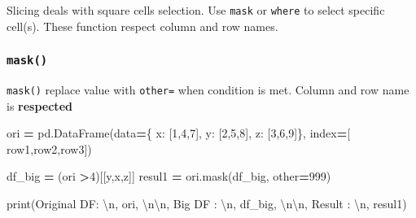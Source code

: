 \documentclass[
]{book}
\newenvironment{Shaded}{\begin{snugshade}}{\end{snugshade}}
\newcommand{\BuiltInTok}[1]{#1}
\newcommand{\CharTok}[1]{\textcolor[rgb]{0.5,0.5,0.5}{#1}}
\newcommand{\DecValTok}[1]{\textcolor[rgb]{0.06,0.06,0.06}{#1}}
\newcommand{\NormalTok}[1]{#1}
\newcommand{\OperatorTok}[1]{\textcolor[rgb]{0.43,0.43,0.43}{\textbf{#1}}}
\newcommand{\StringTok}[1]{\textcolor[rgb]{0.5,0.5,0.5}{#1}}
\begin{document}
Slicing deals with square cells selection. Use \texttt{mask} or \texttt{where} to select specific cell(s). These function respect column and row names.

\hypertarget{mask}{%
\subsubsection{\texorpdfstring{\texttt{mask()}}{mask()}}\label{mask}}

\texttt{mask()} replace value with \texttt{other=} when condition is met. Column and row name is \textbf{respected}

\begin{Shaded}
\begin{Highlighting}[]
\NormalTok{ori }\OperatorTok{=}\NormalTok{ pd.DataFrame(data}\OperatorTok{=}\NormalTok{\{}
     \StringTok{\textquotesingle{}x\textquotesingle{}}\NormalTok{: [}\DecValTok{1}\NormalTok{,}\DecValTok{4}\NormalTok{,}\DecValTok{7}\NormalTok{],}
     \StringTok{\textquotesingle{}y\textquotesingle{}}\NormalTok{: [}\DecValTok{2}\NormalTok{,}\DecValTok{5}\NormalTok{,}\DecValTok{8}\NormalTok{],}
     \StringTok{\textquotesingle{}z\textquotesingle{}}\NormalTok{: [}\DecValTok{3}\NormalTok{,}\DecValTok{6}\NormalTok{,}\DecValTok{9}\NormalTok{]\}, index}\OperatorTok{=}\NormalTok{[}
     \StringTok{\textquotesingle{}row1\textquotesingle{}}\NormalTok{,}\StringTok{\textquotesingle{}row2\textquotesingle{}}\NormalTok{,}\StringTok{\textquotesingle{}row3\textquotesingle{}}\NormalTok{])}

\NormalTok{df\_big }\OperatorTok{=}\NormalTok{ (ori }\OperatorTok{\textgreater{}}\DecValTok{4}\NormalTok{)[[}\StringTok{\textquotesingle{}y\textquotesingle{}}\NormalTok{,}\StringTok{\textquotesingle{}x\textquotesingle{}}\NormalTok{,}\StringTok{\textquotesingle{}z\textquotesingle{}}\NormalTok{]]}
\NormalTok{resul1 }\OperatorTok{=}\NormalTok{ ori.mask(df\_big, other}\OperatorTok{=}\DecValTok{999}\NormalTok{)}

\BuiltInTok{print}\NormalTok{(}\StringTok{\textquotesingle{}Original DF: }\CharTok{\textbackslash{}n}\StringTok{\textquotesingle{}}\NormalTok{, ori, }\StringTok{\textquotesingle{}}\CharTok{\textbackslash{}n\textbackslash{}n}\StringTok{\textquotesingle{}}\NormalTok{,}
      \StringTok{\textquotesingle{}Big DF : }\CharTok{\textbackslash{}n}\StringTok{\textquotesingle{}}\NormalTok{, df\_big, }\StringTok{\textquotesingle{}}\CharTok{\textbackslash{}n\textbackslash{}n}\StringTok{\textquotesingle{}}\NormalTok{,}
      \StringTok{\textquotesingle{}Result : }\CharTok{\textbackslash{}n}\StringTok{\textquotesingle{}}\NormalTok{, resul1)}
\end{Highlighting}
\end{Shaded}
\end{document}
